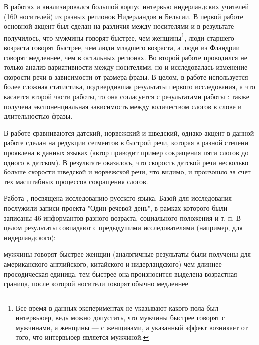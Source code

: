 \par В работах \citep{verhoeven04} и \citep{quene08} анализировался большой корпус интервью нидерландских учителей (160 носителей) из разных регионов Нидерландов и Бельгии. В первой работе основной акцент был сделан на различия между носителями и в результате получилось, что мужчины говорят быстрее, чем женщины\footnote{Все время в данных экспериментах не указывают какого пола был интервьюер, ведь можно допустить, что мужчины быстрее говорят  с мужчинами, а женщины --- с женщинами, а указанный эффект возникает от того, что интервьюер является мужчиной.}, люди старшего возраста говорят быстрее, чем люди младшего возраста, а люди из Фландрии говорят медленнее, чем в остальных регионах. Во второй работе проводился не только анализ вариативности между носителями, но и исследовалась изменение скорости речи в зависимости от размера фразы. В целом, в работе \citep{verhoeven04} используется более сложная статистика, подтвердившая результаты первого исследования, а что касается второй части работы, то она согласуется с результатами  работы \citep{fonagy60}: также получена экспоненциальная зависимость между количеством слогов в слове и длительностью фразы.
\par В работе \citep{hilton11} сравниваются датский, норвежский и шведский, однако акцент в данной работе сделан на редукции сегментов в быстрой речи, которая в разной степени проявлена в данных языках (автор приводит пример сокращения пяти слогов до одного в датском). В результате оказалось, что скорость датской речи несколько больше скорости шведской и норвежской речи, что видимо, и произошло за счет тех масштабных процессов сокращения слогов.
\par Работа \citep{stepanova11}, посвящена исследованию русского языка. Базой для исследования послужили записи проекта "Один речевой день", в рамках которого были записаны 46 информантов разного возраста, социального положения и т. п. В целом результаты совпадают с предыдущими исследователями (например, \citep{verhoeven04} для нидерландского):
\begin{itemize}
\mytem мужчины говорят быстрее женщин (аналогичные результаты были получены для американского английского, китайского и нидерландского)
\mytem чем длиннее просодическая единица, тем быстрее она произносится
\mytem выделена возрастная граница, после которой носители говорят обычно медленнее
\end{itemize}
